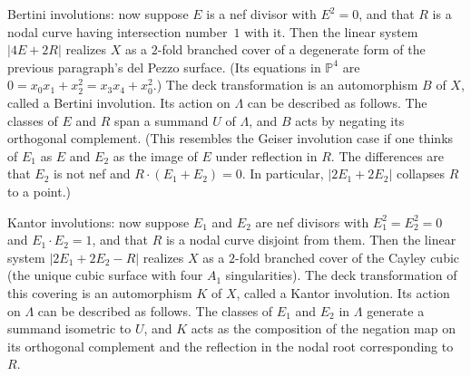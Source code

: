 \documentclass[12pt]{amsart}
\def\P{\mathbb{P}}
\numberwithin{theorem}{section}
\numberwithin{equation}{section}
\numberwithin{figure}{section}
\theoremstyle{remark}
\begin{document}
Bertini involutions: now suppose $E$ is a nef divisor with $E^2=0$,
and that $R$ is a nodal curve having intersection number~$1$ with it.
Then the linear system $|4E+2R|$ realizes $X$ as a $2$-fold branched
cover of a degenerate form of the previous paragraph's del Pezzo
surface.  (Its equations in $\P^4$ are $0=x_0x_1 +x_2^2= x_3x_4
+x_0^2$.)  The deck transformation is an automorphism $B$ of $X$,
called a Bertini involution.  Its action on $\Lambda$ can be described
as follows.  The classes of $E$ and $R$ span a summand $U$ of
$\Lambda$, and $B$ acts by negating its orthogonal complement.  
(This resembles the Geiser involution case if one
thinks of $E_1$ as $E$ and $E_2$ as the image of $E$ under reflection
in $R$.  The differences are that $E_2$ is not nef and
$R\cdot(E_1+E_2)=0$.  In particular, $|2E_1+2E_2|$ collapses $R$ to a
point.)

Kantor involutions: now suppose $E_1$ and $E_2$ are nef divisors with
$E_1^2=E_2^2=0$ and $E_1\cdot E_2=1$, and that $R$ is a nodal curve
disjoint from them.  Then the linear system $|2E_1+2E_2-R|$ realizes
$X$ as a $2$-fold branched cover of the Cayley cubic (the unique cubic
surface with four $A_1$ singularities).  The deck transformation of
this covering is an automorphism $K$ of $X$, called a Kantor
involution.  Its action on $\Lambda$ can be described as follows.  The
classes of $E_1$ and $E_2$ in $\Lambda$ generate a summand isometric
to $U$, and $K$ acts as the composition of the negation map on its
orthogonal complement and the reflection in the nodal root
corresponding to $R$.
\end{document}
